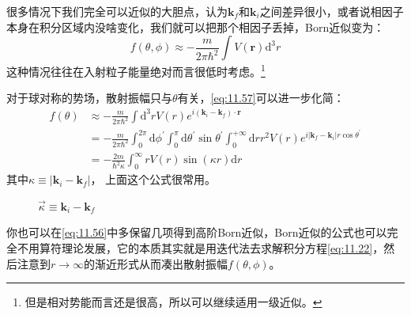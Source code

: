 \documentclass[a4paper,zihao=-4,linespread=1]{ctexrep}
\begin{document}
	很多情况下我们完全可以近似的大胆点，认为$\mathbf{k}_f$和$\mathbf{k}_i$之间差异很小，或者说相因子本身在积分区域内没啥变化，我们就可以把那个相因子丢掉，Born近似变为：
	\begin{equation}
		\label{eq:11.58}
		\boxed{
			f(\theta,\phi)\approx -\frac{m}{2\pi\hbar^2}\int V(\mathbf{r})\mathrm{d}^3r}
	\end{equation}
	这种情况往往在入射粒子能量绝对而言很低时考虑。\footnote{但是相对势能而言还是很高，所以可以继续适用一级近似。}
	
	对于球对称的势场，散射振幅只与$\theta$有关，\ref{eq:11.57}可以进一步化简：
	\begin{equation}
		\begin{aligned}
			\label{eq:11.59}
				f(\theta)&\approx -\frac{m}{2\pi\hbar^2}\int\mathrm{d}^3r V({r})e^{i\left(\mathbf{k}_i-\mathbf{k}_f\right)\cdot \mathbf{r}}\\
				&=-\frac{m}{2\pi\hbar^2}\int_0^{2\pi}\mathrm{d}\phi^\prime\int_0^{\pi}\mathrm{d}\theta^\prime\sin\theta^\prime\int_0^{+\infty}\mathrm{d}r r^2 V(r)e^{i\left|\mathbf{k}_f-\mathbf{k}_i\right|r\cos\theta^\prime}\\
				&=\boxed{
				-\frac{2 m}{\hbar^{2} \kappa} \int_{0}^{\infty} r V(r) \sin (\kappa r) \mathrm{d}r
			}
		\end{aligned}
	\end{equation}
	其中$\kappa\equiv\left|\mathbf{k}_i-\mathbf{k}_f\right|$， 上面这个公式很常用。
	\begin{figure}[h]
		\centering
		\label{fig:11.5}
		\caption{$\vec{\kappa}\equiv \mathbf{k}_i-\mathbf{k}_f$}
	\end{figure}	

	你也可以在\ref{eq:11.56}中多保留几项得到高阶Born近似，Born近似的公式也可以完全不用算符理论发展，它的本质其实就是用迭代法去求解积分方程\ref{eq:11.22}，然后注意到$r\to\infty$的渐近形式从而凑出散射振幅$f(\theta,\phi)$。
	
\end{document}
